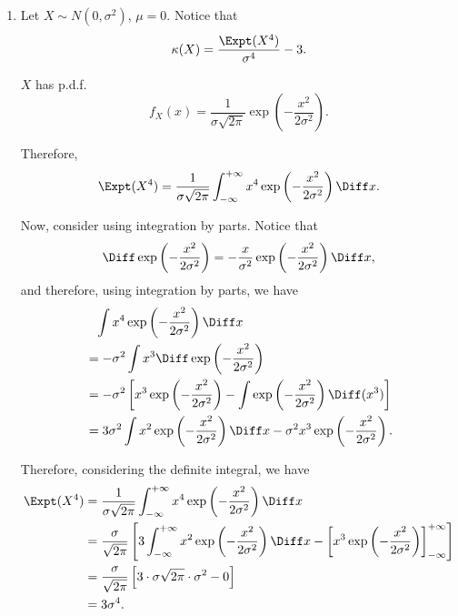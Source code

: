 \begin{enumerate}
    \item Let \(X \sim N(0, \sigma^2)\), \(\mu = 0\).
          Notice that
          \begin{align*}
              \kappa(X) = \frac{\Expt(X^4)}{\sigma^4} - 3.
          \end{align*}

          \(X\) has p.d.f.
          \[
              f_X(x) = \frac{1}{\sigma\sqrt{2\pi}}\exp\left(-\frac{x^2}{2\sigma^2}\right).
          \]

          Therefore,
          \[
              \Expt(X^4) = \frac{1}{\sigma\sqrt{2\pi}} \int_{-\infty}^{+\infty} x^4 \exp\left(-\frac{x^2}{2\sigma^2}\right) \Diff x.
          \]

          Now, consider using integration by parts. Notice that
          \[
              \Diff \exp\left(-\frac{x^2}{2\sigma^2}\right) = - \frac{x}{\sigma^2} \exp\left(-\frac{x^2}{2\sigma^2}\right) \Diff x,
          \]
          and therefore, using integration by parts, we have
          \begin{align*}
               & \phantom{=} \int x^4 \exp\left(-\frac{x^2}{2\sigma^2}\right) \Diff x                                                               \\
               & = - \sigma^2 \int x^3 \Diff \exp\left(-\frac{x^2}{2\sigma^2}\right)                                                                \\
               & = - \sigma^2 \left[ x^3 \exp\left(-\frac{x^2}{2\sigma^2}\right) - \int \exp\left(-\frac{x^2}{2\sigma^2}\right) \Diff (x^3) \right] \\
               & = 3 \sigma^2 \int x^2 \exp\left(-\frac{x^2}{2\sigma^2}\right) \Diff x - \sigma^2 x^3 \exp\left(-\frac{x^2}{2\sigma^2}\right).
          \end{align*}

          Therefore, considering the definite integral, we have
          \begin{align*}
              \Expt(X^4) & = \frac{1}{\sigma\sqrt{2\pi}} \int_{-\infty}^{+\infty} x^4 \exp\left(-\frac{x^2}{2\sigma^2}\right) \Diff x                                                                                                 \\
                         & = \frac{\sigma}{\sqrt{2\pi}} \left[3 \int_{-\infty}^{+\infty} x^2 \exp \left(- \frac{x^2}{2\sigma^2}\right)\Diff x - \left[x^3 \exp\left(- \frac{x^2}{2 \sigma^2}\right)\right]^{+\infty}_{-\infty}\right] \\
                         & = \frac{\sigma}{\sqrt{2\pi}} \left[3 \cdot \sigma \sqrt{2\pi} \cdot \sigma^2 - 0\right]                                                                                                                    \\
                         & = 3 \sigma^4.
          \end{align*}


\end{enumerate}

